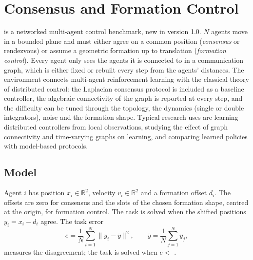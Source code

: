 \begingroup
\setlength{\emergencystretch}{3em}
\chapter{Consensus and Formation Control}\label{chap:consensus}

 is a networked multi-agent control
benchmark, new in version 1.0. $N$ agents move in a bounded plane and must
either agree on a common position (\emph{consensus} or rendezvous) or assume a
geometric formation up to translation (\emph{formation control}). Every agent
only sees the agents it is connected to in a communication graph, which is
either fixed or rebuilt every step from the agents' distances. The environment
connects multi-agent reinforcement learning with the classical theory of
distributed control: the Laplacian consensus protocol is included as a baseline
controller, the algebraic connectivity of the graph is reported at every step,
and the difficulty can be tuned through the topology, the dynamics (single or
double integrators), noise and the formation shape. Typical research uses are
learning distributed controllers from local observations, studying the effect of
graph connectivity and time-varying graphs on learning, and comparing learned
policies with model-based protocols.

\section{Model}\label{sec:consensus-model}

Agent $i$ has position $x_i \in \mathbb{R}^2$, velocity $v_i \in \mathbb{R}^2$
and a formation offset $d_i$. The offsets are zero for consensus and the slots
of the chosen formation shape, centred at the origin, for formation control.
The task is solved when the shifted positions $y_i = x_i - d_i$ agree. The
task error
\begin{equation}
  e = \frac{1}{N} \sum_{i=1}^{N} \lVert y_i - \bar y \rVert^2,
  \qquad \bar y = \frac{1}{N} \sum_{j=1}^{N} y_j,
  \label{eq:consensus-error}
\end{equation}
measures the disagreement; the task is solved when $e <$ .


